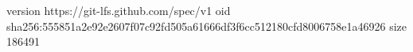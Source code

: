 version https://git-lfs.github.com/spec/v1
oid sha256:555851a2e92e2607f07c92fd505a61666df3f6cc512180cfd8006758e1a46926
size 186491
